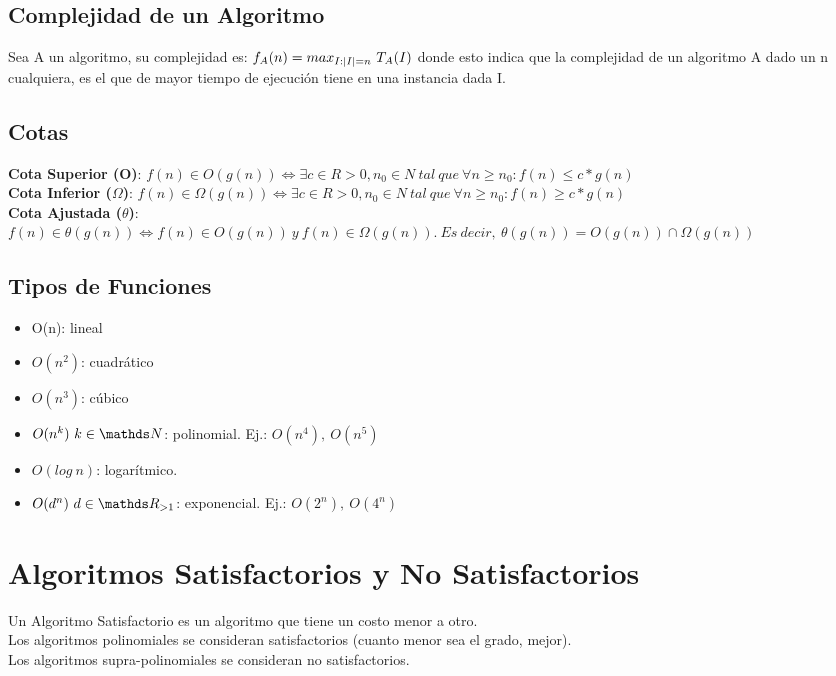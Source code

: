 \documentclass[10pt,a4paper]{article}
\begin{document}
\subsection*{Complejidad de un Algoritmo}
Sea A un algoritmo, su complejidad es: $f_{A}(n) = max_{I:\longitud{I}=n} \ T_{A}(I)$ donde esto indica que la complejidad de un algoritmo A dado un n cualquiera, es el que de mayor tiempo de ejecución tiene en una instancia dada I. 
\subsection*{Cotas}
\textbf{Cota Superior (O)}: $f (n) \in O(g(n)) \iff \exists c \in R>0, n_{0} \in N \ tal \ que \
\forall n \ge n_{0} : f(n) \le c \ast g(n)$  \\
\textbf{Cota Inferior ($\Omega$)}: $f (n) \in \Omega(g(n)) \iff \exists c \in R>0, n_{0} \in N \ tal \ que \ \forall n \ge n_{0} : f(n) \ge c \ast g(n) $ \\
\textbf{Cota Ajustada ($\theta$)}:  $f (n) \in \theta(g(n)) \iff f (n) \in O(g(n)) \ y \ f (n) \in \Omega(g(n)).\ Es \ decir, \ \theta(g(n)) = O(g(n)) \cap \Omega(g(n))$
\subsection*{Tipos de Funciones}
\begin{itemize}
    \item O(n): lineal
    \item $O(n^{2})$: cuadrático
    \item $O(n^{3})$: cúbico
    \item $O(n^{k}) \ k \in \nat$: polinomial. Ej.: $O(n^{4}), \ O(n^{5})$
    \item $O(log \ n)$: logarítmico. 
    \item $O(d^{n}) \ d \in \float_{>1}$: exponencial. Ej.: $ O(2^{n}), \ O(4^{n})$
\end{itemize}
\section*{Algoritmos Satisfactorios y No Satisfactorios}
Un Algoritmo Satisfactorio es un algoritmo que tiene un costo menor a otro. \\
Los algoritmos polinomiales se consideran satisfactorios (cuanto menor sea el grado, mejor). \\
Los algoritmos supra-polinomiales se consideran no satisfactorios. 
\end{document}
